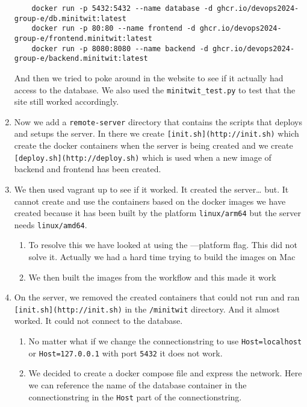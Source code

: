 \begin{enumerate}
\begin{verbatim}
    docker run -p 5432:5432 --name database -d ghcr.io/devops2024-group-e/db.minitwit:latest
    docker run -p 80:80 --name frontend -d ghcr.io/devops2024-group-e/frontend.minitwit:latest
    docker run -p 8080:8080 --name backend -d ghcr.io/devops2024-group-e/backend.minitwit:latest
\end{verbatim}
    And then we tried to poke around in the website to see if it actually   had access to the database. We also used the \texttt{minitwit\_test.py} to test that the site still worked accordingly.
    \item Now we add a \texttt{remote-server} directory that contains the scripts that deploys and setups the server. In there we create \texttt{{[}init.sh{]}(http://init.sh)} which create the docker containers when the server is being created and we create \texttt{{[}deploy.sh{]}(http://deploy.sh)} which is used when a new image of backend and frontend has been created.
    \item We then used vagrant up to see if it worked. It created the server\ldots{} but. It cannot create and use the containers based on the docker images we have created because it has been built by the platform \texttt{linux/arm64} but the server needs \texttt{linux/amd64}.

    \begin{enumerate}
        \item To resolve this we have looked at using the ---platform flag. This did not solve it. Actually we had a hard time trying to build the images on Mac
        \item We then built the images from the workflow and this made it work
    \end{enumerate}
    \item On the server, we removed the created containers that could not run and ran \texttt{{[}init.sh{]}(http://init.sh)} in the \texttt{/minitwit} directory. And it almost worked. It could not connect to the database.

    \begin{enumerate}
    \item No matter what if we change the connectionstring to use \texttt{Host=localhost} or \texttt{Host=127.0.0.1} with port \texttt{5432} it does not work.
    \item We decided to create a docker compose file and express the network. Here we can reference the name of the database container in the connectionstring in the \texttt{Host} part of the connectionstring.


\end{enumerate}
\end{enumerate}
